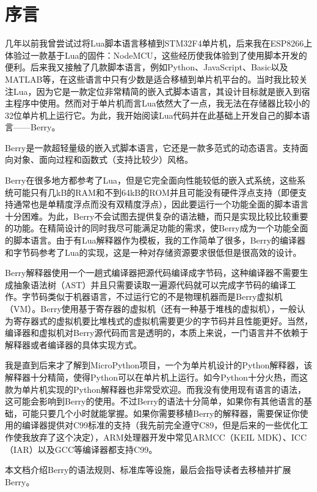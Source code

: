 \chapter*{序\quad 言}

\pagestyle{empty}
\thispagestyle{empty}

几年以前我曾尝试过将Lua脚本语言移植到STM32F4单片机，后来我在ESP8266上体验过一款基于Lua的固件：NodeMCU，这些经历使我体验到了使用脚本开发的便利。后来我又接触了几款脚本语言，例如Python、JavaScript、Basic以及MATLAB等，在这些语言中只有少数是适合移植到单片机平台的。当时我比较关注Lua，因为它是一款定位非常精简的嵌入式脚本语言，其设计目标就是嵌入到宿主程序中使用。然而对于单片机而言Lua依然大了一点，我无法在存储器比较小的32位单片机上运行它。为此，我开始阅读Lua代码并在此基础上开发自己的脚本语言——Berry。

Berry是一款超轻量级的嵌入式脚本语言，它还是一款多范式的动态语言。支持面向对象、面向过程和函数式（支持比较少）风格。

Berry在很多地方都参考了Lua，但是它完全面向性能较低的嵌入式系统，这些系统可能只有几kB的RAM和不到64kB的ROM并且可能没有硬件浮点支持（即便支持通常也是单精度浮点而没有双精度浮点），因此要运行一个功能全面的脚本语言十分困难。为此，Berry不会试图去提供复杂的语法糖，而只是实现比较比较重要的功能。在精简设计的同时我尽可能满足功能的需求，使Berry成为一个功能全面的脚本语言。由于有Lua解释器作为模板，我的工作简单了很多，Berry的编译器和字节码参考了Lua的实现，这是一种对存储资源要求很低但是很高效的设计。

Berry解释器使用一个一趟式编译器把源代码编译成字节码，这种编译器不需要生成抽象语法树（AST）并且只需要读取一遍源代码就可以完成字节码的编译工作。字节码类似于机器语言，不过运行它的不是物理机器而是Berry虚拟机（VM）。Berry使用基于寄存器的虚拟机（还有一种基于堆栈的虚拟机），一般认为寄存器式的虚拟机要比堆栈式的虚拟机需要更少的字节码并且性能更好。当然，编译器和虚拟机对Berry源代码而言是透明的，本质上来说，一门语言并不依赖于解释器或者编译器的具体实现方式。

我是直到后来才了解到MicroPython项目，一个为单片机设计的Python解释器，该解释器十分精简，使得Python可以在单片机上运行。如今Python十分火热，而这款为单片机实现的Python解释器也非常受欢迎。而我没有使用现有语言的语法，这可能会影响到Berry的使用。不过Berry的语法十分简单，如果你有其他语言的基础，可能只要几个小时就能掌握。如果你需要移植Berry的解释器，需要保证你使用的编译器提供对C99标准的支持（我先前完全遵守C89，但是后来的一些优化工作使我放弃了这个决定），ARM处理器开发中常见ARMCC（KEIL MDK）、ICC（IAR）以及GCC等编译器都支持C99。

本文档介绍Berry的语法规则、标准库等设施，最后会指导读者去移植并扩展Berry。

